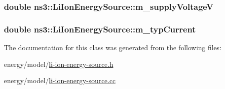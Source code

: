 \subsubsection[{\texorpdfstring{m\+\_\+supply\+VoltageV}{m_supplyVoltageV}}]{\setlength{\rightskip}{0pt plus 5cm}double ns3\+::\+Li\+Ion\+Energy\+Source\+::m\+\_\+supply\+VoltageV\hspace{0.3cm}{\ttfamily [private]}}\hypertarget{classns3_1_1LiIonEnergySource_a52a95a68d5ee4c420a207d00c2905eb2}{}\label{classns3_1_1LiIonEnergySource_a52a95a68d5ee4c420a207d00c2905eb2}
\subsubsection[{\texorpdfstring{m\+\_\+typ\+Current}{m_typCurrent}}]{\setlength{\rightskip}{0pt plus 5cm}double ns3\+::\+Li\+Ion\+Energy\+Source\+::m\+\_\+typ\+Current\hspace{0.3cm}{\ttfamily [private]}}\hypertarget{classns3_1_1LiIonEnergySource_af4e0f258f6a3a020eae2f695b1d0db9f}{}\label{classns3_1_1LiIonEnergySource_af4e0f258f6a3a020eae2f695b1d0db9f}


The documentation for this class was generated from the following files\+:\begin{DoxyCompactItemize}
\item 
energy/model/\hyperlink{li-ion-energy-source_8h}{li-\/ion-\/energy-\/source.\+h}\item 
energy/model/\hyperlink{model_2li-ion-energy-source_8cc}{li-\/ion-\/energy-\/source.\+cc}\end{DoxyCompactItemize}

